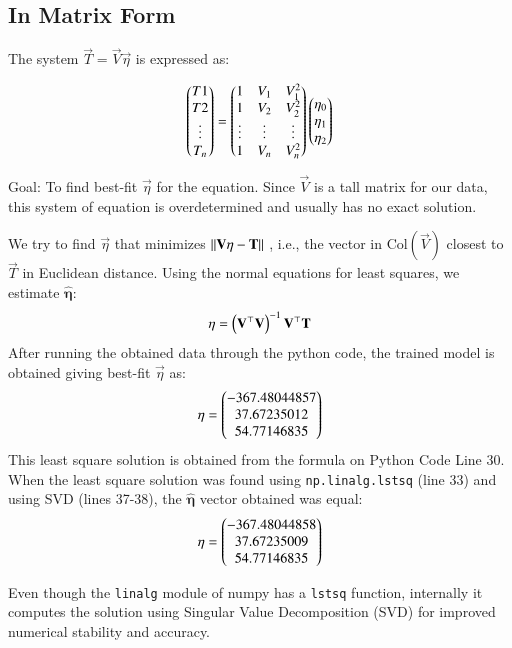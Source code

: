 \documentclass{article}
\begin{document}
\subsection{In Matrix Form}
The system $ \vec{T} = \vec{V} \vec{\eta} $ is expressed as:

\begin{align}
    \begin{pmatrix}T1 \\ T2 \\ \vdots \\ T_n \end{pmatrix} = \begin{pmatrix}1 & V_1 & V_1^2 \\
    1 & V_2 & V_2^2 \\
    \vdots & \vdots & \vdots \\
    1 & V_n & V_n^2\end{pmatrix} \begin{pmatrix} \eta_0 \\ \eta_1 \\ \eta_2\end{pmatrix}
\end{align}

Goal: To find best-fit $\vec{\eta}$ for the equation.
Since $\vec{V}$ is a tall matrix for our data, this system of equation is overdetermined and usually has no exact solution.

We try to find ${\vec{\eta}}$ that minimizes $\left\lVert\mathbf{V}\mathbf{\eta} - \mathbf{T}\right\rVert$ , i.e., the vector in $\text{Col}(\vec{V})$ closest to $\vec{T}$ in Euclidean distance.
Using the normal equations for least squares, we estimate $\hat{\mathbf{\eta}}$:
\begin{align}
    \mathbf{\eta} = \left(\mathbf{V}^{\top}\mathbf{V}\right)^{-1}\mathbf{V}^{\top}\mathbf{T}
\end{align}
After running the obtained data through the python code, the trained model is obtained giving best-fit $\vec{\eta}$ as:
\begin{align}    
\mathbf{\eta} = 
\begin{pmatrix}
    -367.48044857 \\
    37.67235012 \\
    54.77146835
\end{pmatrix}\end{align}
This least square solution is obtained from the formula on Python Code Line 30.
When the least square solution was found using \texttt{np.linalg.lstsq} (line 33) and using SVD (lines 37-38), the $\hat{\mathbf{\eta}}$ vector obtained was equal:
\begin{align}
    \mathbf{\eta} = \begin{pmatrix}-367.48044858 \\
    37.67235009 \\
    54.77146835\end{pmatrix}
\end{align}

Even though the \texttt{linalg} module of numpy has a \texttt{lstsq} function, internally it computes the solution using Singular Value Decomposition (SVD) for improved numerical stability and accuracy.
\end{document}

